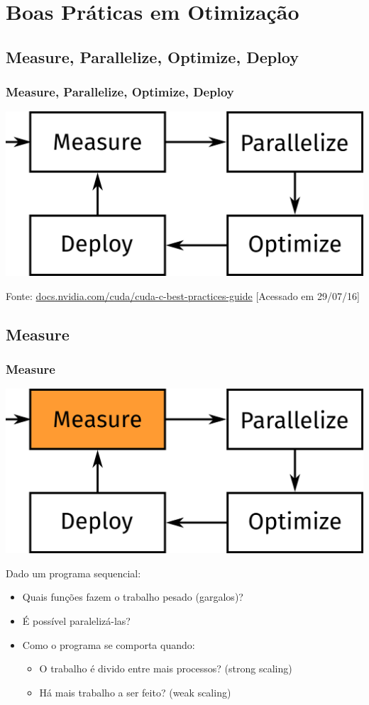 \documentclass[10pt, compress]{beamer}
\begin{document}
\section{Boas Práticas em Otimização}

\subsection{Measure, Parallelize, Optimize, Deploy}

\begin{frame}
    \frametitle{Measure, Parallelize, Optimize, Deploy}
    \centering
    \includegraphics[width=.9\textwidth]{MPOD}
    \vfill

    \begin{center}
        \tiny{Fonte: \url{docs.nvidia.com/cuda/cuda-c-best-practices-guide} [Acessado em 29/07/16]}
    \end{center}
\end{frame}

\subsection{Measure}

\begin{frame}
    \frametitle{Measure}
    \begin{center}
    \includegraphics[width=.4\textwidth]{MPOD_M}
    \end{center}
    \vfill

    \pause
    Dado um \alert{programa sequencial}:
    \begin{itemize}
        \item Quais funções fazem o \alert{trabalho pesado} (\alert{gargalos})?
            \pause
        \item É possível \alert{paralelizá-las}?
            \pause
        \item Como o programa se comporta quando:
            \begin{itemize}
                \item O trabalho é divido entre mais processos? (\alert{strong scaling})
                    \pause
                \item Há mais trabalho a ser feito? (\alert{weak scaling})
            \end{itemize}
    \end{itemize}
\end{frame}
\end{document}

